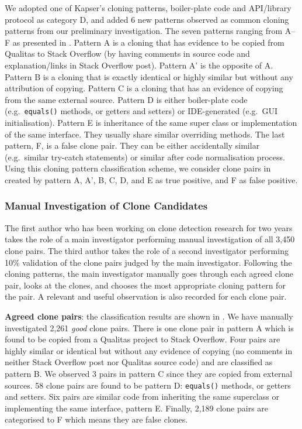 \documentclass{sig-alternate-05-2015}
\begin{document}
We adopted one of Kapser's cloning patterns, boiler-plate code and API/library protocol as category D, and added 6 new patterns observed as common cloning patterns from our preliminary investigation. The seven patterns ranging from A--F as presented in . Pattern A is a cloning that has evidence to be copied from Qualitas to Stack Overflow (by having comments in source code and explanation/links in Stack Overflow post). Pattern A' is the opposite of A. Pattern B is a cloning that is exactly identical or highly similar but without any attribution of copying. Pattern C is a cloning that has an evidence of copying from the same external source. Pattern D is either boiler-plate code (e.g.~\verb|equals()| methods, or getters and setters) or IDE-generated (e.g.~GUI initialisation). Pattern E is inheritance of the same super class or implementation of the same interface. They usually share similar overriding methods. The last pattern, F, is a false clone pair. They can be either accidentally similar (e.g.~similar try-catch statements) or similar after code normalisation process. Using this cloning pattern classification scheme, we consider clone pairs in created by pattern A, A', B, C, D, and E as true positive, and F as false positive. 

\subsubsection{Manual Investigation of Clone Candidates}

The first author who has been working on clone detection research for two years takes the role of a main investigator performing manual investigation of all 3,450 clone pairs. The third author takes the role of a second investigator performing 10\% validation of the clone pairs judged by the main investigator. Following the cloning patterns, the main investigator manually goes through each agreed clone pair, looks at the clones, and chooses the most appropriate cloning pattern for the pair. A relevant and useful observation is also recorded for each clone pair. 

\textbf{Agreed clone pairs}: the classification results are shown in . We have manually investigated 2,261 \textit{good} clone pairs. There is one clone pair in pattern A which is found to be copied from a Qualitas project to Stack Overflow. Four pairs are highly similar or identical but without any evidence of copying (no comments in neither Stack Overflow post nor Qualitas source code) and are classified as pattern B. We observed 3 pairs in pattern C since they are copied from external sources. %
58 clone pairs are found to be pattern D: \verb|equals()| methods, or getters and setters. Six pairs are similar code from inheriting the same superclass or implementing the same interface, pattern E. Finally, 2,189 clone pairs are categorised to F which means they are false clones.
\end{document}
